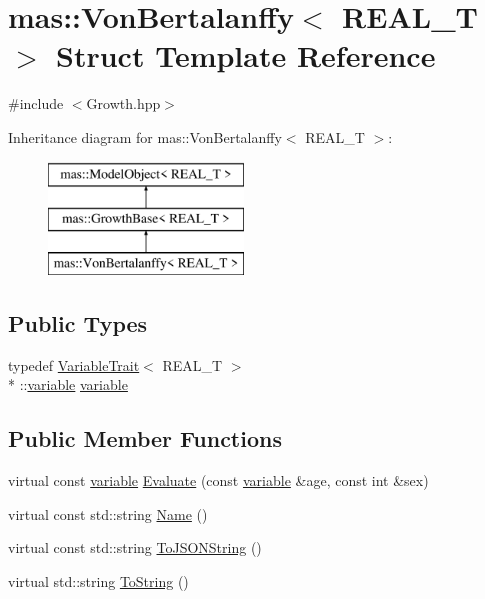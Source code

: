 \hypertarget{structmas_1_1_von_bertalanffy}{\section{mas\-:\-:Von\-Bertalanffy$<$ R\-E\-A\-L\-\_\-\-T $>$ Struct Template Reference}
\label{structmas_1_1_von_bertalanffy}
}


{\ttfamily \#include $<$Growth.\-hpp$>$}

Inheritance diagram for mas\-:\-:Von\-Bertalanffy$<$ R\-E\-A\-L\-\_\-\-T $>$\-:\begin{figure}[H]
\begin{center}
\leavevmode
\includegraphics[height=3.000000cm]{structmas_1_1_von_bertalanffy}
\end{center}
\end{figure}
\subsection*{Public Types}
\begin{DoxyCompactItemize}
\item 
typedef \hyperlink{structmas_1_1_variable_trait}{Variable\-Trait}$<$ R\-E\-A\-L\-\_\-\-T $>$\\*
\-::\hyperlink{structmas_1_1_von_bertalanffy_a44edcdf23cc66a10c6744741588492b9}{variable} \hyperlink{structmas_1_1_von_bertalanffy_a44edcdf23cc66a10c6744741588492b9}{variable}
\end{DoxyCompactItemize}
\subsection*{Public Member Functions}
\begin{DoxyCompactItemize}
\item 
virtual const \hyperlink{structmas_1_1_von_bertalanffy_a44edcdf23cc66a10c6744741588492b9}{variable} \hyperlink{structmas_1_1_von_bertalanffy_ac89c031af93f2baf47d357bca9c37b6a}{Evaluate} (const \hyperlink{structmas_1_1_von_bertalanffy_a44edcdf23cc66a10c6744741588492b9}{variable} \&age, const int \&sex)
\item 
virtual const std\-::string \hyperlink{structmas_1_1_von_bertalanffy_a8d8c204940577c3b4e515baae839c15d}{Name} ()
\item 
virtual const std\-::string \hyperlink{structmas_1_1_von_bertalanffy_a1b579d133d8f9d068afec3b3a386ceec}{To\-J\-S\-O\-N\-String} ()
\item 
virtual std\-::string \hyperlink{structmas_1_1_von_bertalanffy_af301e548d6d3e9df5a2fc65132378195}{To\-String} ()
\end{DoxyCompactItemize}
